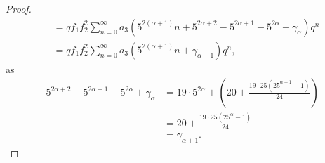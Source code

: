 \documentclass[10pt,a4paper]{amsart}
\begin{document}
\begin{proof}
\begin{align*}
&= qf_1 f_2^2 \sum\limits_{n=0}^\infty a_3\left(5^{2(\alpha+1)}n + 5^{2\alpha+2} - 5^{2\alpha+1} - 5^{2\alpha} + \gamma_\alpha\right)q^n \\
&= qf_1f_2^2 \sum\limits_{n=0}^\infty a_3 \left(5^{2(\alpha+1)}n + \gamma_{\alpha+1}\right) q^n,
\end{align*}
as
\begin{align*}
5^{2\alpha+2} - 5^{2\alpha+1} - 5^{2\alpha} + \gamma_\alpha &=  19 \cdot 5^{2\alpha} + \left(20 + \frac{19 \cdot 25(25^{\alpha-1}-1)}{24}\right) \\
&= 20 + \frac{19 \cdot 25(25^{\alpha}-1)}{24} \\
&= \gamma_{\alpha+1}.
\end{align*}
\end{proof}
\end{document}
